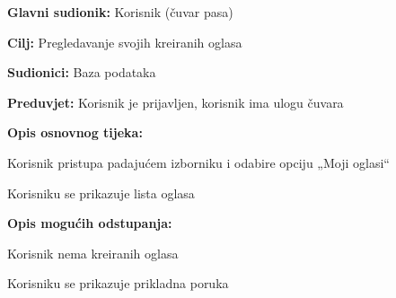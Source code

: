 					\noindent {}
					\begin{packed_item}
						
						\item \textbf{Glavni sudionik: } Korisnik (čuvar pasa)
						\item  \textbf{Cilj:} Pregledavanje svojih kreiranih oglasa
						\item  \textbf{Sudionici:} Baza podataka 
						\item  \textbf{Preduvjet:} Korisnik je prijavljen, korisnik ima ulogu čuvara
						\item  \textbf{Opis osnovnog tijeka:}
						
						\item[] \begin{packed_enum}
							
							\item Korisnik pristupa padajućem izborniku i odabire opciju „Moji oglasi“  
							\item Korisniku se prikazuje lista oglasa
							
						\end{packed_enum}
						
						\item  \textbf{Opis mogućih odstupanja:}
						
						\item[] \begin{packed_item}
							
							\item[2.a] Korisnik nema kreiranih oglasa
							\item[] \begin{packed_enum}
								
								\item Korisniku se prikazuje prikladna poruka
								
							\end{packed_enum}
						\end{packed_item}
					\end{packed_item}	
				
